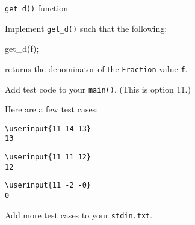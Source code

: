 \verb!get_d()! function

Implement \verb!get_d()! such that the following:
\begin{console}
get_d(f);
\end{console}
returns the denominator of the \verb!Fraction! value \verb!f!.

Add test code to your \verb!main()!.
(This is option 11.)

Here are a few test cases:

\resett
\nextt
\begin{Verbatim}[frame=single, commandchars=\\\{\}]
\userinput{11 14 13}
13
\end{Verbatim}

\nextt
\begin{Verbatim}[frame=single, commandchars=\\\{\}]
\userinput{11 11 12}
12
\end{Verbatim}

\nextt
\begin{Verbatim}[frame=single, commandchars=\\\{\}]
\userinput{11 -2 -0}
0
\end{Verbatim}

Add more test cases to your \verb!stdin.txt!.
